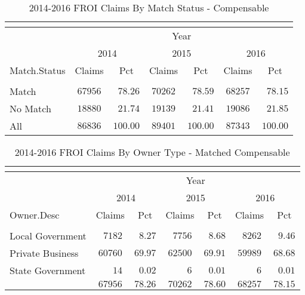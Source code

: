 \documentclass[9pt, oneside]{article}   	%
\begin{document}
\begin{longtable}{lcccccc}
\caption{2014-2016 FROI Claims By Match Status - Compensable}\\ 
\label{Table: Zero.1}\\
\hline
                  \toprule
 & \multicolumn{6}{c}{Year} \\ 
 & \multicolumn{2}{c}{2014} & \multicolumn{2}{c}{2015} & \multicolumn{2}{c}{2016} \\ 
Match.Status  & Claims & Pct & Claims & Pct & Claims & \multicolumn{1}{c}{Pct} \\ 
\midrule\\ [-1\normalbaselineskip]\hline\endhead\hline\endfoot
Match  & $67956$ & $\phantom{0}78.26$ & $70262$ & $\phantom{0}78.59$ & $68257$ & $\phantom{0}78.15$ \\
No Match  & $18880$ & $\phantom{0}21.74$ & $19139$ & $\phantom{0}21.41$ & $19086$ & $\phantom{0}21.85$ \\
\cline{1-1} \cline{2-2} \cline{3-3} \cline{4-4} \cline{5-5} \cline{6-6} \cline{7-7} %
All  & $86836$ & $100.00$ & $89401$ & $100.00$ & $87343$ & $100.00$ \\
\hline 
\end{longtable}


\pagebreak

\begin{longtable}{lcccccc}
\caption{2014-2016 FROI Claims By Owner Type - Matched Compensable}\\ 
\label{Table: Zero.2}\\
\hline
                  \toprule
 & \multicolumn{6}{c}{Year} \\ 
 & \multicolumn{2}{c}{2014} & \multicolumn{2}{c}{2015} & \multicolumn{2}{c}{2016} \\ 
Owner.Desc  & Claims & Pct & Claims & Pct & Claims & \multicolumn{1}{c}{Pct} \\ 
\midrule\\ [-1\normalbaselineskip]\hline\endhead\hline\endfoot
Local Government  & $\phantom{0}7182$ & $\phantom{0}8.27$ & $\phantom{0}7756$ & $\phantom{0}8.68$ & $\phantom{0}8262$ & $\phantom{0}9.46$ \\
Private Business  & $60760$ & $69.97$ & $62500$ & $69.91$ & $59989$ & $68.68$ \\
State Government  & $\phantom{000}14$ & $\phantom{0}0.02$ & $\phantom{0000}6$ & $\phantom{0}0.01$ & $\phantom{0000}6$ & $\phantom{0}0.01$ \\
\cline{1-1} \cline{2-2} \cline{3-3} \cline{4-4} \cline{5-5} \cline{6-6} \cline{7-7} %
 & $67956$ & $78.26$ & $70262$ & $78.60$ & $68257$ & $78.15$ \\
\hline 
\end{longtable}
\end{document}
